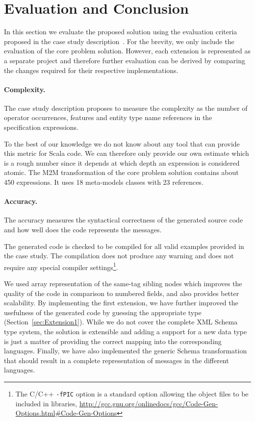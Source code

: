 
\section{Evaluation and Conclusion}
\label{sec:EvaluationConclusion}

In this section we evaluate the proposed solution using the evaluation criteria proposed in the case study description~\cite{Lano2014}.
For the brevity, we only include the evaluation of the core problem solution.
However, each extension is represented as a separate project and therefore further evaluation can be derived by comparing the changes required for their respective implementations.

\paragraph{Complexity.}

The case study description proposes to measure the complexity as the number of operator occurrences, features and entity type name references in the specification expressions.

To the best of our knowledge we do not know about any tool that can provide this metric for Scala code.
We can therefore only provide our own estimate which is a rough number since it depends at which depth an expression is considered atomic.
The M2M transformation of the core problem solution contains about 450 expressions. It uses 18 meta-models classes with 23 references.

\paragraph{Accuracy.}
%
The accuracy measures the syntactical correctness of the generated source code and how well does the code represents the \FIXML messages.

The generated code is checked to be compiled for all valid examples provided in the case study.
The compilation does not produce any warning and does not require any special compiler settings\footnote{The C/C++ \texttt{-fPIC} option is a standard option allowing the object files to be included in libraries, \Cf \url{http://gcc.gnu.org/onlinedocs/gcc/Code-Gen-Options.html\#Code-Gen-Options}}.

We used array representation of the same-tag sibling nodes which improves the quality of the code in comparison to numbered fields, and also provides better scalability.
By implementing the first extension, we have further improved the usefulness of the generated code by guessing the appropriate type (\Cf Section~\ref{sec:Extension1}).
While we do not cover the complete XML Schema type system, the solution is extensible and adding a support for a new data type is just a matter of providing the correct mapping into the corresponding languages.
Finally, we have also implemented the generic \FIXML Schema transformation that should result in a complete representation of \FIXML messages in the different languages.

